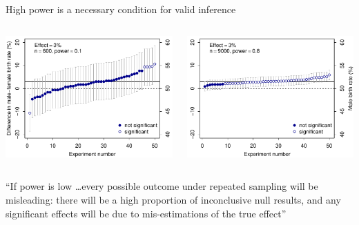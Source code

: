 \documentclass[aspectratio=169]{beamer}
\begin{document}
\begin{frame}{High power is a necessary condition for valid inference}

\begin{columns}
\begin{column}{7.9cm}
\includegraphics[width=7.9cm]{fig/birthdiff10}
\end{column}
%
\begin{column}{7.9cm}
\includegraphics[width=7.9cm]{fig/birthdiff80}
\end{column}
\end{columns}

\vspace{2ex}

``If power is low \dots every possible outcome under repeated sampling will
be misleading: there will be a high proportion of inconclusive null results,
and any significant effects will be due to mis-estimations of the true
effect'' \citep[][p.~1317]{VasishthGelman21}

\end{frame}
\end{document}
